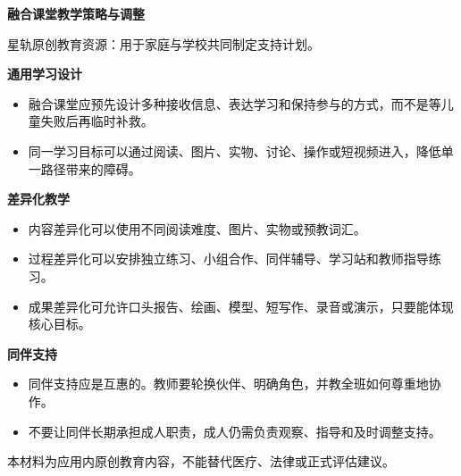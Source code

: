 \documentclass[11pt]{article}
\begin{document}
{\color[HTML]{1F5FD2}\LARGE\bfseries 融合课堂教学策略与调整\par}
{\color[HTML]{667085}\small 星轨原创教育资源：用于家庭与学校共同制定支持计划。\par}
\vspace{0.8em}
{\color[HTML]{111827}\large\bfseries 通用学习设计\par}
\begin{itemize}
\item 融合课堂应预先设计多种接收信息、表达学习和保持参与的方式，而不是等儿童失败后再临时补救。
\item 同一学习目标可以通过阅读、图片、实物、讨论、操作或短视频进入，降低单一路径带来的障碍。
\end{itemize}
{\color[HTML]{111827}\large\bfseries 差异化教学\par}
\begin{itemize}
\item 内容差异化可以使用不同阅读难度、图片、实物或预教词汇。
\item 过程差异化可以安排独立练习、小组合作、同伴辅导、学习站和教师指导练习。
\item 成果差异化可允许口头报告、绘画、模型、短写作、录音或演示，只要能体现核心目标。
\end{itemize}
{\color[HTML]{111827}\large\bfseries 同伴支持\par}
\begin{itemize}
\item 同伴支持应是互惠的。教师要轮换伙伴、明确角色，并教全班如何尊重地协作。
\item 不要让同伴长期承担成人职责，成人仍需负责观察、指导和及时调整支持。
\end{itemize}
\vfill
{\color[HTML]{667085}\footnotesize 本材料为应用内原创教育内容，不能替代医疗、法律或正式评估建议。\par}
\end{document}
